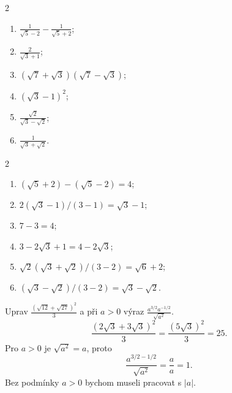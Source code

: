 \documentclass[11pt,a4paper]{article}
\begin{document}
\begin{zadaniReseniBox}[breakable=false,title={Samostatná práce 2: vyber vhodné pravidlo}]
\begin{multicols}{2}
\begin{enumerate}[label=\alph*)]
\item $\displaystyle\frac1{\sqrt5-2}-\frac1{\sqrt5+2}$;
\item $\displaystyle\frac2{\sqrt3+1}$;
\item $(\sqrt7+\sqrt3)(\sqrt7-\sqrt3)$;
\item $(\sqrt3-1)^2$;
\item $\displaystyle\frac{\sqrt2}{\sqrt3-\sqrt2}$;
\item $\displaystyle\frac1{\sqrt3+\sqrt2}$.
\end{enumerate}
\end{multicols}
\tcblower
\begin{multicols}{2}
\begin{enumerate}[label=\alph*)]
\item $(\sqrt5+2)-(\sqrt5-2)=\boxed4$;
\item $2(\sqrt3-1)/(3-1)=\boxed{\sqrt3-1}$;
\item $7-3=\boxed4$;
\item $3-2\sqrt3+1=\boxed{4-2\sqrt3}$;
\item $\sqrt2(\sqrt3+\sqrt2)/(3-2)=\boxed{\sqrt6+2}$;
\item $(\sqrt3-\sqrt2)/(3-2)=\boxed{\sqrt3-\sqrt2}$.
\end{enumerate}
\end{multicols}
\end{zadaniReseniBox}

\begin{prikladReseniBox}[breakable=false,title={Příklad 3: správné pořadí úprav}]
Uprav $\displaystyle\frac{(\sqrt{12}+\sqrt{27})^2}{3}$
a při $a>0$ výraz $\displaystyle\frac{a^{3/2}a^{-1/2}}{\sqrt{a^2}}$.
\tcblower
\[
\frac{(2\sqrt3+3\sqrt3)^2}{3}
=\frac{(5\sqrt3)^2}{3}=\boxed{25}.
\]
Pro $a>0$ je $\sqrt{a^2}=a$, proto
\[
\frac{a^{3/2-1/2}}{\sqrt{a^2}}=\frac aa=\boxed1.
\]
Bez podmínky $a>0$ bychom museli pracovat s $|a|$.
\end{prikladReseniBox}
\end{document}
